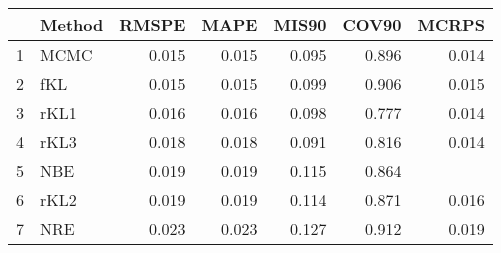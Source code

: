 \documentclass[12pt]{article}
\begin{document}
\thispagestyle{empty}
\begin{table}[ht]
\centering
\begin{tabular}{rlrrrrr}
  \hline
 & Method & RMSPE & MAPE & MIS90 & COV90 & MCRPS \\ 
  \hline
1 & MCMC & 0.015 & 0.015 & 0.095 & 0.896 & 0.014 \\ 
  2 & fKL & 0.015 & 0.015 & 0.099 & 0.906 & 0.015 \\ 
  3 & rKL1 & 0.016 & 0.016 & 0.098 & 0.777 & 0.014 \\ 
  4 & rKL3 & 0.018 & 0.018 & 0.091 & 0.816 & 0.014 \\ 
  5 & NBE & 0.019 & 0.019 & 0.115 & 0.864 &  \\ 
  6 & rKL2 & 0.019 & 0.019 & 0.114 & 0.871 & 0.016 \\ 
  7 & NRE & 0.023 & 0.023 & 0.127 & 0.912 & 0.019 \\ 
   \hline
\end{tabular}
\end{table}
\end{document}

